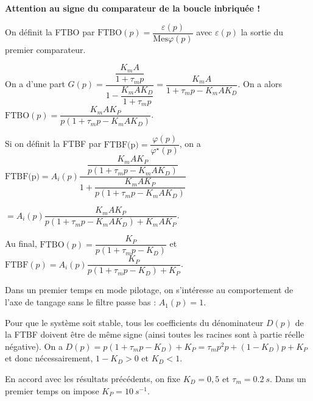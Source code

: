 \ifprof
\begin{corrige}
\textbf{Attention au signe du comparateur de la boucle inbriquée !}

On définit la FTBO par $\text{FTBO}(p)=\dfrac{\varepsilon(p)}{\text{Mes}\varphi(p)}$ avec $\varepsilon(p)$ la sortie du premier comparateur.

On a d'une part $G(p)=\dfrac{\dfrac{K_m A}{1+\tau_m p}}{1-\dfrac{K_m A K_D }{1+\tau_m p}}= \dfrac{K_m A}{1+\tau_m p-K_m A K_D }$.
On a alors $\text{FTBO}(p)=\dfrac{K_m A K_P}{p\left(1+\tau_m p-K_m A K_D \right)}$. 

Si on définit la FTBF par $\text{FTBF(p)}=\dfrac{\varphi(p)}{\varphi^{\star}(p)}$, on a 
$\text{FTBF(p)}=A_i(p)\dfrac{\dfrac{K_m A K_P}{p\left(1+\tau_m p-K_m A K_D \right)}}{1+\dfrac{K_m A K_P}{p\left(1+\tau_m p-K_m A K_D \right)}}$ 

$=A_i(p)\dfrac{K_m A K_P}{p\left(1+\tau_m p-K_m A K_D \right)+K_m A K_P}$.

Au final, 
$\text{FTBO}(p)=\dfrac{ K_P}{p\left(1+\tau_m p-K_D \right)}$ et 
$\text{FTBF}(p)=A_i(p)\dfrac{K_P}{p\left(1+\tau_m p- K_D \right)+K_P}$.
\end{corrige}
\else
\fi

Dans un premier temps en mode pilotage, on s’intéresse au comportement de l’axe de tangage sans le filtre passe bas :
$A_1(p)=1$.

\ifprof
\begin{corrige}
Pour que le système soit stable, tous les coefficients du dénominateur $D(p)$ de la FTBF doivent être de même signe (ainsi toutes les racines sont à partie réelle négative). On a 
$D(p)=p\left(1+\tau_m p- K_D \right)+K_P = \tau_m p^2 p+ \left(1-K_D \right)p +K_P$ et donc nécessairement, 
$1-K_D >0$ et $K_D < 1$.
\end{corrige}
\else
\fi

\ifprof
\else
En accord avec les résultats précédents, on fixe $K_D = 0,5$ et $\tau_m = \SI{0,2}{s}$.
Dans un premier temps on impose $K_P = \SI{10}{s^{-1}}$.
\fi
%
%



